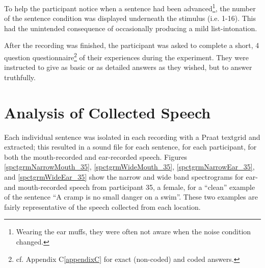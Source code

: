 \documentclass[dissertation,copyright]{uathesis}
\begin{document}
To help the participant notice when a sentence had been advanced\footnote{Wearing the ear muffs, they were often not aware when the noise condition changed.}, the number of the sentence condition was displayed underneath the stimulus (i.e. 1-16).  This had the unintended consequence of occasionally producing a mild list-intonation. 

After the recording was finished, the participant was asked to complete a short, 4 question questionnaire\footnote{cf. Appendix C\ref{appendixC} for exact (non-coded) and coded answers.} of their experiences during the experiment.  They were instructed to give as basic or as detailed answers as they wished, but to answer truthfully.  

\section{Analysis of Collected Speech}

Each individual sentence was isolated in each recording with a Praat textgrid and extracted; this resulted in a sound file for each sentence, for each participant, for both the mouth-recorded and ear-recorded speech.  Figures \ref{spctgrmNarrowMouth_35}, \ref{spctgrmWideMouth_35}, \ref{spctgrmNarrowEar_35}, and \ref{spctgrmWideEar_35} show the narrow and wide band spectrograms for ear- and mouth-recorded speech from participant 35, a female, for a ``clean'' example of the sentence ``A cramp is no small danger on a swim''.  These two examples are fairly representative of the speech collected from each location.
\end{document}

